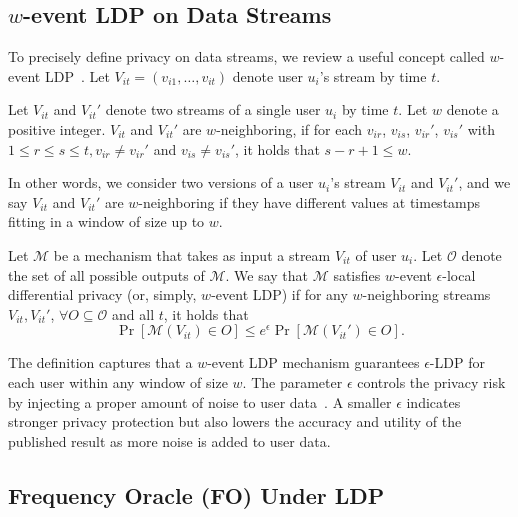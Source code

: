 \documentclass[acmsmall]{acmart}
\newcommand{\CM}{\mathcal{M}}
\newcommand{\CO}{\mathcal{O}}
\begin{document}
\subsection{\texorpdfstring{$w$-event LDP on Data Streams}{w-event LDP on Data Streams}}
To precisely define privacy on data streams, we review a useful concept called
$w$-event LDP~\cite{Ren2022}.
Let $V_{it}=(v_{i1},\ldots,v_{it})$ denote user $u_i$'s stream by time $t$.

\begin{definition}[$w$-neighboring]
  Let $V_{it}$ and $V_{it}'$ denote two streams of a single user $u_i$ by time
  $t$.
  Let $w$ denote a positive integer.
  $V_{it}$ and $V_{it}'$ are $w$-neighboring, if for each $v_{ir}$, $v_{is}$,
  $v_{ir}'$, $v_{is}'$ with $1\le r \le s \le t, v_{ir}\neq v_{ir}'$ and $v_{is}
  \neq v_{is}'$, it holds that $s - r + 1 \le w$.
\end{definition}

In other words, we consider two versions of a user $u_i$'s stream $V_{it}$ and
$V_{it}'$, and we say $V_{it}$ and $V_{it}'$ are $w$-neighboring if they have
different values at timestamps fitting in a window of size up to $w$.

\begin{definition}
  Let $\CM$ be a mechanism that takes as input a stream $V_{it}$ of user $u_i$.
  Let $\CO$ denote the set of all possible outputs of $\CM$.
  We say that $\CM$ satisfies $w$-event $\epsilon$-local differential privacy
  (or, simply, $w$-event LDP) if for any $w$-neighboring streams $V_{it},
  V_{it}'$, $\forall O\subseteq\CO$ and all $t$, it holds that
  \[
    \Pr[\CM(V_{it})\in O] \leq e^\epsilon \Pr[\CM(V_{it}') \in O].
  \]
\end{definition}

The definition captures that a $w$-event LDP mechanism guarantees $\epsilon$-LDP
for each user within any window of size $w$.
The parameter $\epsilon$ controls the privacy risk by injecting a proper amount
of noise to user data~\cite{Dwork2013}.
A smaller $\epsilon$ indicates stronger privacy protection but also lowers the
accuracy and utility of the published result as more noise is added to user
data.




\subsection{Frequency Oracle (FO) Under LDP}
\end{document}

